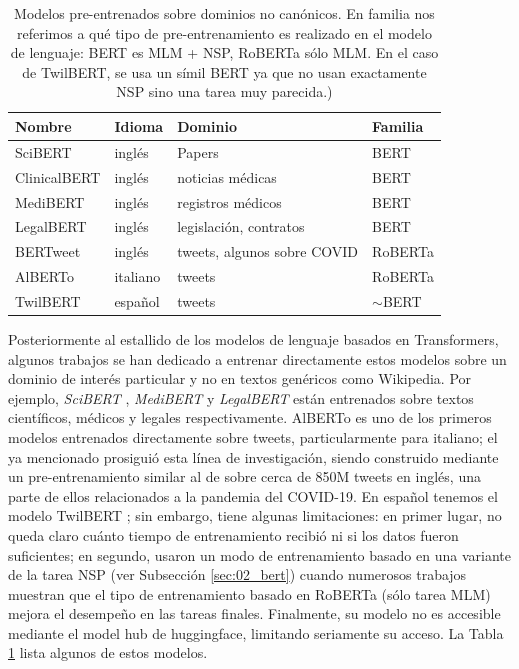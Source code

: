 \begin{table}
    \centering
    \begin{tabular}{llll}
        Nombre                                 & Idioma            & Dominio                          & Familia     \\
        \hline
        SciBERT         & inglés            & Papers                           & BERT        \\
        ClinicalBERT    & inglés            & noticias médicas                 & BERT        \\
        MediBERT        & inglés            & registros médicos                & BERT         \\
        LegalBERT       & inglés            & legislación, contratos           & BERT        \\
        BERTweet        & inglés            & tweets, algunos sobre COVID      & RoBERTa     \\
        AlBERTo         & italiano          & tweets                           & RoBERTa     \\
        TwilBERT        & español           & tweets                           & $\sim$BERT        \\
        \hline
    \end{tabular}

    \caption{Modelos pre-entrenados sobre dominios no canónicos. En familia nos referimos a qué tipo de pre-entrenamiento es realizado en el modelo de lenguaje: BERT es MLM + NSP, RoBERTa sólo MLM. En el caso de TwilBERT, se usa un símil BERT ya que no usan exactamente NSP sino una tarea muy parecida.)}
    \label{tab:bert_pretrained_models}
\end{table}


Posteriormente al estallido de los modelos de lenguaje basados en Transformers, algunos trabajos se han dedicado a entrenar directamente estos modelos sobre un dominio de interés particular y no en textos genéricos como Wikipedia. Por ejemplo, \emph{SciBERT} \cite{beltagy-etal-2019-scibert}, \emph{MediBERT} \cite{rasmy2021med} y \emph{LegalBERT} \cite{chalkidis-etal-2020-legal} están entrenados sobre textos científicos, médicos y legales respectivamente. AlBERTo \cite{polignano2019alberto} es uno de los primeros modelos entrenados directamente sobre tweets, particularmente para italiano; el ya mencionado \bertweet{} \cite{dat2020bertweet} prosiguió esta línea de investigación, siendo construido mediante un pre-entrenamiento similar al de \roberta{} \cite{liu2019roberta} sobre cerca de 850M tweets en inglés, una parte de ellos relacionados a la pandemia del COVID-19. En español tenemos el modelo TwilBERT \cite{gonzalez2021twilbert}; sin embargo, tiene algunas limitaciones: en primer lugar, no queda claro cuánto tiempo de entrenamiento recibió ni si los datos fueron suficientes; en segundo, usaron un modo de entrenamiento basado en una variante de la tarea NSP (ver Subsección \ref{sec:02_bert}) cuando numerosos trabajos muestran que el tipo de entrenamiento basado en RoBERTa (sólo tarea MLM) mejora el desempeño en las tareas finales. Finalmente, su modelo no es accesible mediante el model hub de huggingface, limitando seriamente su acceso. La Tabla \ref{tab:bert_pretrained_models} lista algunos de estos modelos.


